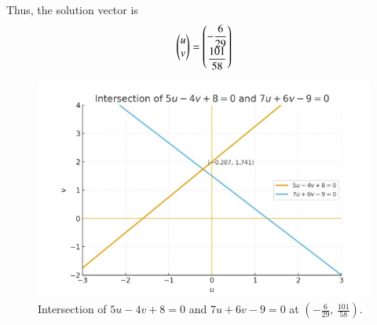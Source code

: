 \documentclass[journal]{IEEEtran}
\begin{document}
Thus, the solution vector is
\begin{align}
    \begin{pmatrix}u \\ v\end{pmatrix}=\begin{pmatrix}-\dfrac{6}{29} \\ \dfrac{101}{58}\end{pmatrix}
\end{align}

\newpage
\begin{figure}[H]
  \centering
  \includegraphics[width=0.8\linewidth]{figs/fig.jpeg}
  \caption{Intersection of $5u-4v+8=0$ and $7u+6v-9=0$ at
           $\left(-\tfrac{6}{29},\,\tfrac{101}{58}\right)$.}
  \label{fig:5.2.2}
\end{figure}





 
\end{document}
